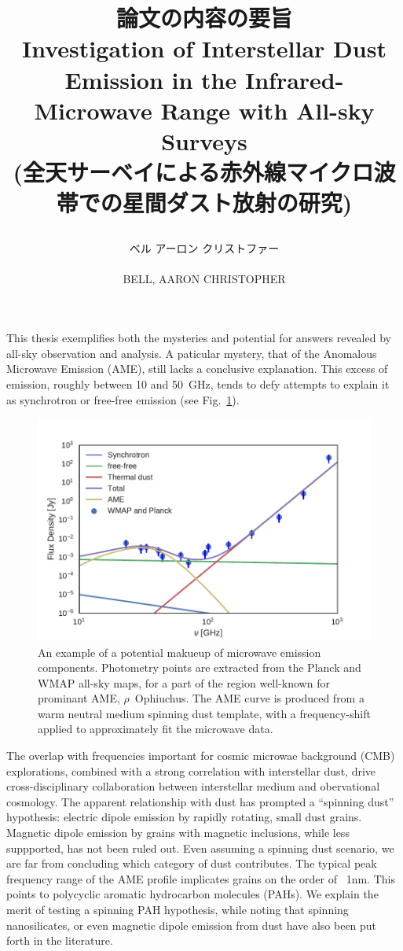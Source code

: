 \documentclass[12pt,a4paper]{article}
\title{
\begin{CJK}{UTF8}{min}{\small 論文の内容の要旨}\\
Investigation of Interstellar Dust Emission in the Infrared-Microwave Range with All-sky Surveys\\
{\small(全天サーベイによる赤外線マイクロ波帯での星間ダスト放射の研究)}\\
\end{CJK}
}
\author{
    \begin{CJK}{UTF8}{min}ベル アーロン クリストファー\end{CJK}\\
BELL, AARON CHRISTOPHER}
\date{}
\begin{document}
\maketitle

This thesis exemplifies both the mysteries and potential for answers revealed by all-sky observation and analysis. 
A paticular mystery, that of the Anomalous Microwave Emission (AME), still lacks a conclusive explanation.  
This excess of emission, roughly between 10 and 50~GHz, tends to defy attempts to explain it as synchrotron or free-free emission (see Fig.~\ref{fig:mw_foregrounds_demo_rOph}).
      \begin{figure}[h]
        \centering
        \includegraphics[width=\textwidth/2]{../Plots/ch_intro/mw_foregrounds_demo_rOph_sub_Jy5.pdf}
          \caption{\small An example of a potential makueup of microwave emission components. 
          Photometry points are extracted from the Planck and WMAP all-sky maps, for a part of the region well-known for prominant AME, $\rho$~Ophiuchus. 
          The AME curve is produced from a warm neutral medium spinning dust template, with a frequency-shift applied to approximately fit the microwave data.}
        \label{fig:mw_foregrounds_demo_rOph}
      \end{figure}
The overlap with frequencies important for cosmic microwae background (CMB) explorations, combined with a strong correlation with interstellar dust, drive cross-disciplinary collaboration between interstellar medium and obervational cosmology. 
The apparent relationship with dust has prompted a ``spinning dust'' hypothesis:  electric dipole emission by rapidly rotating, small dust grains. 
Magnetic dipole emission by grains with magnetic inclusions, while less suppported, has not been ruled out. Even assuming a spinning dust scenario, we are far from concluding which category of dust contributes. 
The typical peak frequency range of the AME profile implicates grains on the order of ~1nm. 
This points to polycyclic aromatic hydrocarbon molecules (PAHs). 
We explain the merit of testing a spinning PAH hypothesis, while noting that spinning nanosilicates, or even magnetic dipole emission from dust have also been put forth in the literature.
\end{document}
